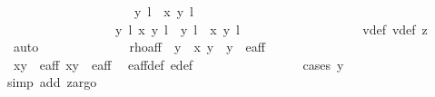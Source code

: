 \begin{isabellebody}
\ \ \ \ \ \ \ \ \ \ \ \ \ \ \ \ \ \ \ {\isacharparenleft}{\isacharparenleft}{\isacharparenleft}{}{\isacharcomma}\ y{\isacharparenright}{\isacharcomma}\ l{\isacharparenright}{\isacharcomma}\ {\isasymtau}\ {\isacharparenleft}x{\isacharprime}{\isacharcomma}\ y{\isacharprime}{\isacharparenright}{\isacharcomma}\ l{\isacharprime}\ {\isacharplus}\ {}{\isacharparenright}{\isacharbraceright}{\isacharparenright}\ {\isacharequal}\ \isanewline
\ \ \ \ \ \ \ \ \ \ \ \ \ \ \ \ {\isacharbraceleft}{\isacharparenleft}{\isacharparenleft}{\isacharparenleft}{}{\isacharcomma}\ y{\isacharparenright}{\isacharcomma}\ l{\isacharparenright}{\isacharcomma}\ {\isacharparenleft}x{\isacharprime}{\isacharcomma}\ y{\isacharprime}{\isacharparenright}{\isacharcomma}\ l{\isacharprime}{\isacharparenright}{\isacharcomma}\ {\isacharparenleft}{\isacharparenleft}{\isacharparenleft}{}{\isacharcomma}\ y{\isacharparenright}{\isacharcomma}\ l{\isacharparenright}{\isacharcomma}\ {\isasymtau}\ {\isacharparenleft}x{\isacharprime}{\isacharcomma}\ y{\isacharprime}{\isacharparenright}{\isacharcomma}\ l{\isacharprime}\ {\isacharplus}\ {}{\isacharparenright}{\isacharbraceright}{\isachardoublequoteclose}\ \isanewline
\ \ \ \ \ \ \ \ \ \ \ \ \ \ \isamarkupfalse%
\ v{}{\isacharunderscore}def\ v{}{\isacharunderscore}def\ z{}\ \isamarkupfalse%
\ auto\isanewline
\ \ \ \ \ \ \ \ \ \ \ \ \isamarkupfalse%
\ rho{\isacharunderscore}aff{\isacharcolon}\ {\isachardoublequoteopen}{\isasymrho}\ {\isacharparenleft}y\ {\isacharasterisk}\ x{\isacharprime}{\isacharcomma}\ y\ {\isacharasterisk}\ y{\isacharprime}{\isacharparenright}\ {\isasymin}\ e{\isacharunderscore}aff{\isachardoublequoteclose}\isanewline
\ \ \ \ \ \ \ \ \ \ \ \ \ \ \ \ \isamarkupfalse%
\ {\isacartoucheopen}{\isacharparenleft}x{\isacharcomma}y{\isacharparenright}\ {\isasymin}\ e{\isacharunderscore}aff{\isacartoucheclose}\ {\isacartoucheopen}{\isacharparenleft}x{\isacharprime}{\isacharcomma}y{\isacharprime}{\isacharparenright}\ {\isasymin}\ e{\isacharunderscore}aff{\isacartoucheclose}\ \isamarkupfalse%
\ e{\isacharunderscore}aff{\isacharunderscore}def\ e{\isacharprime}{\isacharunderscore}def\isanewline
\ \ \ \ \ \ \ \ \ \ \ \ \ \ \ \ \isamarkupfalse%
{\isacharparenleft}cases\ {\isachardoublequoteopen}y\ {\isacharequal}\ {}{\isachardoublequoteclose}{\isacharparenright}\isanewline
\ \ \ \ \ \ \ \ \ \ \ \ \ \ \ \ \isamarkupfalse%
{\isacharparenleft}simp\ add{\isacharcolon}\ z{}{\isacharcomma}argo{\isacharparenright}\ \isanewline

\end{isabellebody}
